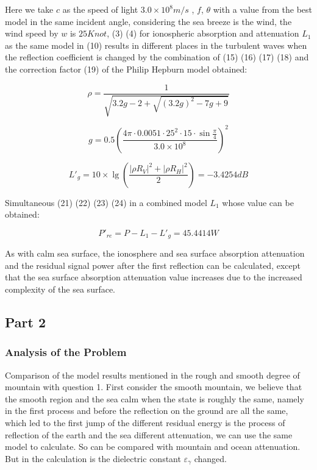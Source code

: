 \documentclass{mcmthesis}
\begin{document}
Here we take $c$ as the speed of light $3.0 \times {10^8}m/s$ , $f$, $\theta$ with a value from the best model in the same incident angle, considering the sea breeze is the wind, the wind speed by $w$ is $25Knot$, (3) (4) for ionospheric absorption and attenuation $L_1$ as the same model in (10) results in different places in the turbulent waves when the reflection coefficient is changed by the combination of (15) (16) (17) (18) and the correction factor (19) of the Philip Hepburn model obtained:  

\begin{equation} \label{23}
\rho  = \frac{1}{{\sqrt {3.2g - 2 + \sqrt {{{(3.2g)}^2} - 7g + 9} } }}
\end{equation}

\begin{equation} \label{24}
g = 0.5{(\frac{{4\pi  \cdot 0.0051 \cdot {{25}^2} \cdot 15 \cdot \sin \frac{\pi }{4}}}{{3.0 \times {{10}^8}}})^2}
\end{equation}

\begin{equation} \label{25}
L{'_g} = 10 \times \lg (\frac{{{{\left| {\rho {R_V}} \right|}^2} + {{\left| {\rho {R_H}} \right|}^2}}}{2}) =  - 3.4254dB
\end{equation}

Simultaneous (21) (22) (23) (24) in a combined model $L_1$ whose value can be obtained:

\begin{equation} \label{26}
P{'_{re}} = P - {L_1} - L{'_g} = 45.4414W
\end{equation}

As with calm sea surface, the ionosphere and sea surface absorption attenuation and the residual signal power after the first reflection can be calculated, except that the sea surface absorption attenuation value increases due to the increased complexity of the sea surface.

\subsection{Part 2}

\subsubsection{Analysis of the Problem}

Comparison of the model results mentioned in the rough and smooth degree of mountain with question 1. First consider the smooth mountain, we believe that the smooth region and the sea calm when the state is roughly the same, namely in the first process and before the reflection on the ground are all the same, which led to the first jump of the different residual energy is the process of reflection of the earth and the sea different attenuation, we can use the same model to calculate. So can be compared with mountain and ocean attenuation. But in the calculation is the dielectric constant ${\varepsilon _\gamma }$ changed.
\end{document}
